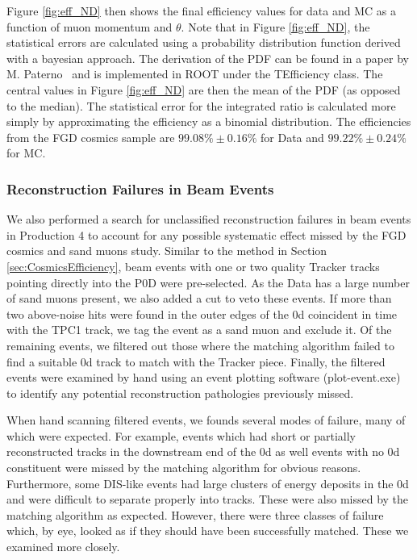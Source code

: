Figure \ref{fig:eff_ND} then shows the final efficiency values for data and MC as a function of muon momentum and $\theta$. Note that in Figure \ref{fig:eff_ND}, the statistical errors are calculated using a probability distribution function derived with a bayesian approach. The derivation of the PDF can be found in a paper by M. Paterno~\cite{bayes} and is implemented in ROOT under the TEfficiency class. The central values in Figure \ref{fig:eff_ND} are then the mean of the PDF (as opposed to the median). The statistical error for the integrated ratio is calculated more simply by approximating the efficiency as a binomial distribution. The efficiencies from the FGD cosmics sample are $99.08\%\pm 0.16\%$ for Data and $99.22\%\pm 0.24\%$ for MC.

\subsubsection{Reconstruction Failures in Beam Events}

We also performed a search for unclassified reconstruction failures in beam events in Production 4 to account for any possible systematic effect missed by the FGD cosmics and sand muons study. Similar to the method in Section \ref{sec:CosmicsEfficiency}, beam events with one or two quality Tracker tracks pointing directly into the P0D were pre-selected. As the Data has a large number of sand muons present, we also added a cut to veto these events. If more than two above-noise hits were found in the outer edges of the \p0d coincident in time with the TPC1 track, we tag the event as a sand muon and exclude it. Of the remaining events, we filtered out those where the matching algorithm failed to find a suitable \p0d track to match with the Tracker piece. Finally, the filtered events were examined by hand using an event plotting software (plot-event.exe) to identify any potential reconstruction pathologies previously missed.

When hand scanning filtered events, we founds several modes of failure, many of which were expected. For example, events which had short or partially reconstructed tracks in the downstream end of the \p0d as well events with no \p0d constituent were missed by the matching algorithm for obvious reasons. Furthermore, some DIS-like events had large clusters of energy deposits in the \p0d and were difficult to separate properly into tracks. These were also missed by the matching algorithm as expected. However, there were three classes of failure which, by eye, looked as if they should have been successfully matched. These we examined more closely.

